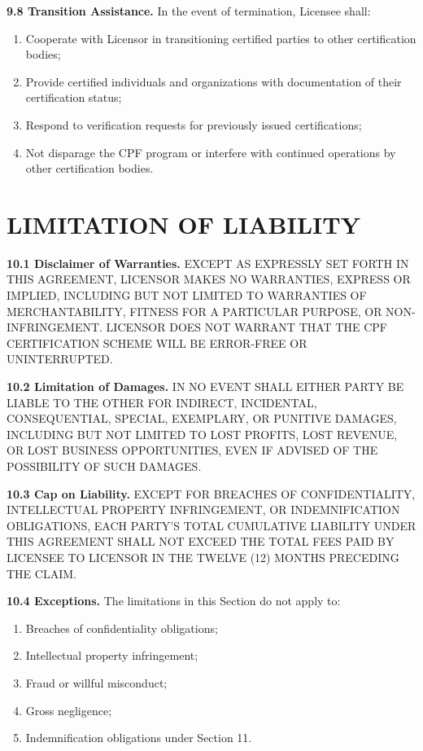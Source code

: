 \documentclass[11pt,a4paper]{article}
\begin{document}
\textbf{9.8 Transition Assistance.} In the event of termination, Licensee shall:

\begin{enumerate}[label=\alph*)]
\item Cooperate with Licensor in transitioning certified parties to other certification bodies;
\item Provide certified individuals and organizations with documentation of their certification status;
\item Respond to verification requests for previously issued certifications;
\item Not disparage the CPF program or interfere with continued operations by other certification bodies.
\end{enumerate}

\section{LIMITATION OF LIABILITY}

\textbf{10.1 Disclaimer of Warranties.} EXCEPT AS EXPRESSLY SET FORTH IN THIS AGREEMENT, LICENSOR MAKES NO WARRANTIES, EXPRESS OR IMPLIED, INCLUDING BUT NOT LIMITED TO WARRANTIES OF MERCHANTABILITY, FITNESS FOR A PARTICULAR PURPOSE, OR NON-INFRINGEMENT. LICENSOR DOES NOT WARRANT THAT THE CPF CERTIFICATION SCHEME WILL BE ERROR-FREE OR UNINTERRUPTED.

\textbf{10.2 Limitation of Damages.} IN NO EVENT SHALL EITHER PARTY BE LIABLE TO THE OTHER FOR INDIRECT, INCIDENTAL, CONSEQUENTIAL, SPECIAL, EXEMPLARY, OR PUNITIVE DAMAGES, INCLUDING BUT NOT LIMITED TO LOST PROFITS, LOST REVENUE, OR LOST BUSINESS OPPORTUNITIES, EVEN IF ADVISED OF THE POSSIBILITY OF SUCH DAMAGES.

\textbf{10.3 Cap on Liability.} EXCEPT FOR BREACHES OF CONFIDENTIALITY, INTELLECTUAL PROPERTY INFRINGEMENT, OR INDEMNIFICATION OBLIGATIONS, EACH PARTY'S TOTAL CUMULATIVE LIABILITY UNDER THIS AGREEMENT SHALL NOT EXCEED THE TOTAL FEES PAID BY LICENSEE TO LICENSOR IN THE TWELVE (12) MONTHS PRECEDING THE CLAIM.

\textbf{10.4 Exceptions.} The limitations in this Section do not apply to:

\begin{enumerate}[label=\alph*)]
\item Breaches of confidentiality obligations;
\item Intellectual property infringement;
\item Fraud or willful misconduct;
\item Gross negligence;
\item Indemnification obligations under Section 11.
\end{enumerate}
\end{document}
